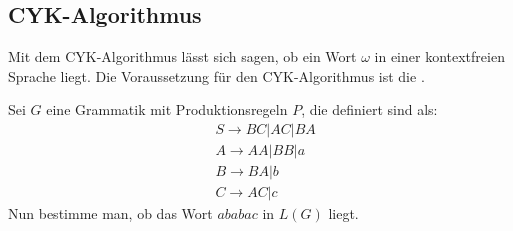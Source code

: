 \subsection{CYK-Algorithmus}
\label{cyk}
Mit dem CYK-Algorithmus lässt sich sagen, ob ein Wort $\omega$ in einer kontextfreien Sprache liegt. Die Voraussetzung für den CYK-Algorithmus ist die .
\begin{bsp}
    Sei $G$ eine Grammatik mit Produktionsregeln $P$, die definiert sind als:
    \begin{align*}
        &S\to BC|AC|BA\\
        &A\to AA|BB|a\\
        &B\to BA|b\\
        &C\to AC|c
    \end{align*}
    Nun bestimme man, ob das Wort $ababac$ in $L(G)$ liegt.
\end{bsp}

